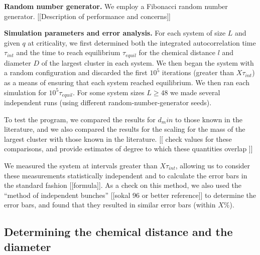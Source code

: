 \documentclass[aps, preprint, groupedaddress]{revtex4}
\begin{document}
{\bf Random number generator.} We employ a Fibonacci random number generator. [[Description of performance and concerns]]

{\bf Simulation parameters and error analysis.}  For each system of size $L$ and given $q$ at criticality, we first determined both the integrated autocorrelation time $\tau_{int}$ and the time to reach equilibrium $\tau_{equil}$ for the chemical distance $l$ and diameter $D$ of the largest cluster in each system. We then began the system with a random configuration and discarded the first $10^5$ iterations (greater than $X \tau_{int}$) as a means of ensuring that each system reached equilibrium.  We then ran each simulation for $10^5 \tau_{equil}$.  For some system sizes $L \ge 48$ we made several independent runs (using different random-number-generator seeds).  

To test the program, we compared the results for $d_min$ to those known in the literature, and we also compared the results for the scaling for the mass of the largest cluster with those known in the literature. [[ check values for these comparisons, and provide estimates of degree to which these quantities overlap ]]

We measured the system at intervals greater than $X \tau_{int}$, allowing us to consider these measurements statistically independent and to calculate the error bars in the standard fashion [[formula]].  As a check on this method, we also used the ``method of independent bunches'' [[sokal 96 or better reference]] to determine the error bars, and found that they resulted in similar error bars (within $X \%$).







\subsection{Determining the chemical distance and the diameter}
\end{document}
